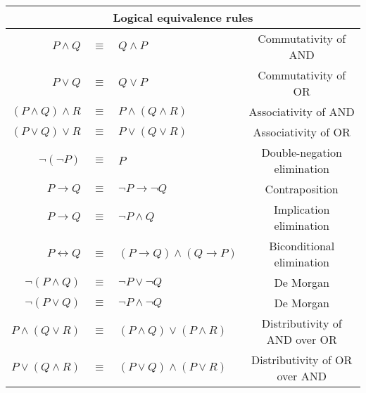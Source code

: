 \documentclass[]{article}
\begin{document}
	\begin{center}
		\begin{tabular}{ | r  c  l | c | } 
			\hline
			\multicolumn{4}{|c|}{Logical equivalence rules} \\
			\hline
			$P \land Q$ & $\equiv$ & $Q \land P$ & Commutativity of AND\\
			\hline
			$P \lor Q$ & $\equiv$ & $Q \lor P$ & Commutativity of OR\\
			\hline
			$(P \land Q) \land R$ & $\equiv$ & $P \land (Q \land R)$ & Associativity of AND\\
			\hline
			$(P \lor Q) \lor R$ & $\equiv$ & $P \lor (Q \lor R)$ & Associativity of OR\\
			\hline
			$\neg(\neg P)$ & $\equiv$ & $P$ & Double-negation elimination\\
			\hline
			$P \rightarrow Q$ & $\equiv$ & $\neg P \rightarrow \neg Q$ & Contraposition\\
			\hline
			$P \rightarrow Q$ & $\equiv$ & $\neg P \land Q$ & Implication elimination\\
			\hline
			$P \leftrightarrow Q$ & $\equiv$ & $(P \rightarrow Q) \land (Q \rightarrow P)$ & Biconditional elimination \\
			\hline
			$\neg(P \land Q)$ & $\equiv$ & $\neg P \lor \neg Q$ & De Morgan\\
			\hline
			$\neg(P \lor Q)$ & $\equiv$ & $\neg P \land \neg Q$ & De Morgan\\
			\hline
			$P \land (Q \lor R)$ & $\equiv$ & $(P \land Q) \lor (P \land R)$ & Distributivity of AND over OR\\
			\hline
			$P \lor (Q \land R)$ & $\equiv$ & $(P \lor Q) \land (P \lor R)$ & Distributivity of OR over AND\\
			\hline
		\end{tabular}
	\end{center}
	
	\noindent 
	
	\noindent 
\end{document}
